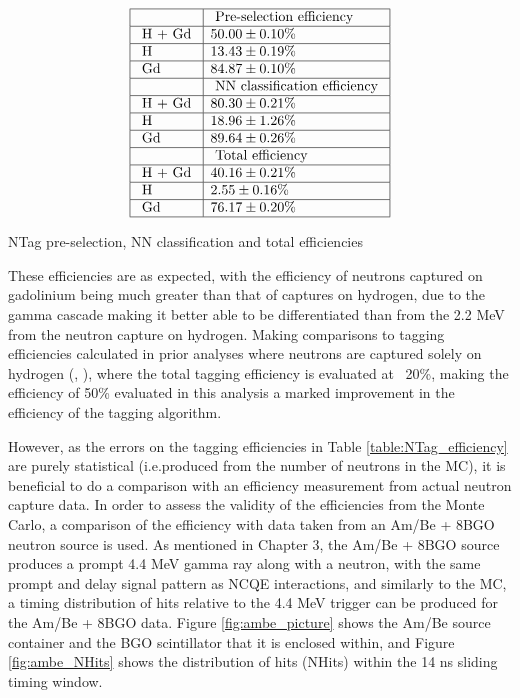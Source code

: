 \begin{table}
    $$
    \begin{array}{|l|l|}
    \hline & \text { Pre-selection efficiency } \\
    \hline \text { H + Gd } &50.00 \pm 0.10 \% \\
    \hline \text{ H } & 13.43 \pm 0.19 \% \\
    \hline \text { Gd } & 84.87 \pm 0.10 \% \\
    \hline & \text { NN classification efficiency } \\
    \hline \text { H + Gd } & 80.30 \pm 0.21 \% \\
    \hline \text { H } & 18.96 \pm 1.26 \% \\
    \hline \text { Gd } & 89.64 \pm 0.26 \% \\
    \hline & \text { Total efficiency } \\
    \hline \text { H + Gd } & 40.16 \pm 0.21 \% \\
    \hline \text { H } & 2.55 \pm 0.16 \% \\
    \hline \text { Gd } & 76.17 \pm 0.20 \% \\
    \hline
    \end{array}
    $$
    \caption{NTag pre-selection, NN classification and total efficiencies}
    \label{table:NTag_efficiency}
\end{table}

These efficiencies are as expected, with the efficiency of neutrons captured on gadolinium being much greater than that of captures on hydrogen, due to the gamma cascade making it better able to be differentiated than from the 2.2 MeV from the neutron capture on hydrogen. Making comparisons to tagging efficiencies calculated in prior analyses where neutrons are captured solely on hydrogen (\cite{tn415_fiacob}, \cite{tn_374}), where the total tagging efficiency is evaluated at ~20\%, making the efficiency of 50\% evaluated in this analysis a marked improvement in the efficiency of the tagging algorithm. 


However, as the errors on the tagging efficiencies in Table \ref{table:NTag_efficiency} are purely statistical (i.e.produced from the number of neutrons in the MC), it is beneficial to do a comparison with an efficiency measurement from actual neutron capture data. In order to assess the validity of the efficiencies from the Monte Carlo, a comparison of the efficiency with data taken from an Am/Be + 8BGO neutron source is used. As mentioned in Chapter 3, the Am/Be + 8BGO source produces a prompt 4.4 MeV gamma ray along with a neutron, with the same prompt and delay signal pattern as NCQE interactions, and similarly to the MC, a timing distribution of hits relative to the 4.4 MeV trigger can be produced for the Am/Be + 8BGO data. Figure \ref{fig:ambe_picture} shows the Am/Be source container and the BGO scintillator that it is enclosed within, and Figure \ref{fig:ambe_NHits} shows the distribution of hits (NHits) within the 14 ns sliding timing window. 



